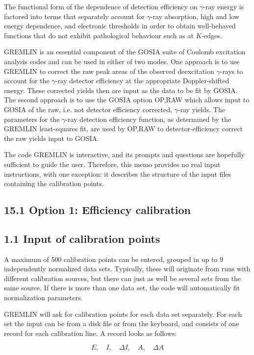 \documentclass[10pt]{article}
\begin{document}
The functional form of the dependence of detection efficiency on $\gamma$-ray energy is factored into terms that separately account for $\gamma$-ray absorption, high and low energy dependence, and electronic thresholds in order to obtain well-behaved functions that do not exhibit pathological behaviour such as at $K$-edges.

GREMLIN is an essential component of the GOSIA suite of Coulomb excitation analysis codes and can be used in either of two modes. One approach is to use GREMLIN to correct the raw peak areas of the observed deexcitation $\gamma$-rays to account for the $\gamma$-ray detector efficiency at the appropriate Doppler-shifted energy. These corrected yields then are input as the data to be fit by GOSIA. The second approach is to use the GOSIA option OP,RAW which allows input to GOSIA of the raw, i.e. not detector efficiency corrected, $\gamma$-ray yields. The parameters for the $\gamma$-ray detection efficiency function, as determined by the GREMLIN least-squares fit, are used by OP,RAW to detector-efficiency correct the raw yields input to GOSIA.

The code GREMLIN is interactive, and its prompts and questions are hopefully sufficient to guide the user. Therefore, this memo provides no real input instructions, with one exception: it describes the structure of the input files containing the calibration points.

\subsection*{15.1 Option 1: Efficiency calibration}
\subsection*{1.1 Input of calibration points}
A maximum of 500 calibration points can be entered, grouped in up to 9 independently normalized data sets. Typically, these will originate from runs with different calibration sources, but there can just as well be several sets from the same source. If there is more than one data set, the code will automatically fit normalization parameters.

GREMLIN will ask for calibration points for each data set separately. For each set the input can be from a disk file or from the keyboard, and consists of one record for each calibration line. A record looks as follows:

$$
E, \quad I, \quad \Delta I, \quad A, \quad \Delta A
$$
\end{document}
